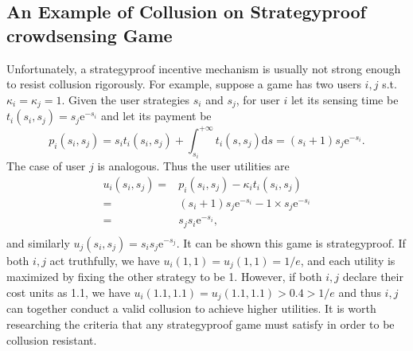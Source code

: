 \documentclass[conference]{IEEEtran}
\theoremstyle{definition}
\begin{document}
{\subsection{An Example of Collusion on Strategyproof crowdsensing Game}
Unfortunately, a strategyproof incentive mechanism is usually not strong enough to resist collusion rigorously. 
{\color{black}
For example, suppose a game has two users $i,j$ s.t. $\kappa_i = \kappa_j = 1$. Given the user strategies $s_i$ and $s_j$, for user $i$ let its sensing time be $t_i(s_i, s_j)=s_j\mathrm{e}^{-s_i}$ and let its payment be $$p_i(s_i, s_j)=s_it_i(s_i, s_j)+\int_{s_i}^{+\infty}t_i(s, s_j)\mathrm{d}s=(s_i+1)s_j\mathrm{e}^{-s_i}.$$ The case of user $j$ is analogous. Thus the user utilities are 
\begin{equation}
\begin{aligned}
u_i(s_i,s_j)=&p_i(s_i, s_j)-\kappa_it_i(s_i, s_j) \\
=&(s_i+1)s_j\mathrm{e}^{-s_i} - 1\times s_j\mathrm{e}^{-s_i} \\
=&s_js_i\mathrm{e}^{-s_i},\\
\end{aligned}
\end{equation}
and similarly $u_j(s_i,s_j)=s_is_j\mathrm{e}^{-s_j}$. 
}
It can be shown this game is strategyproof. If both $i,j$ act truthfully, we have $u_i(1,1)=u_j(1,1)=1/e$, and each utility is maximized by fixing the other strategy to be 1. However, if both $i,j$ declare their cost units as 1.1, we have $u_i(1.1,1.1)=u_j(1.1,1.1)>0.4>1/e$ and thus $i,j$ can together conduct a valid collusion to achieve higher utilities. It is worth researching the criteria that any strategyproof game must satisfy in order to be collusion resistant. %
}
\end{document}
